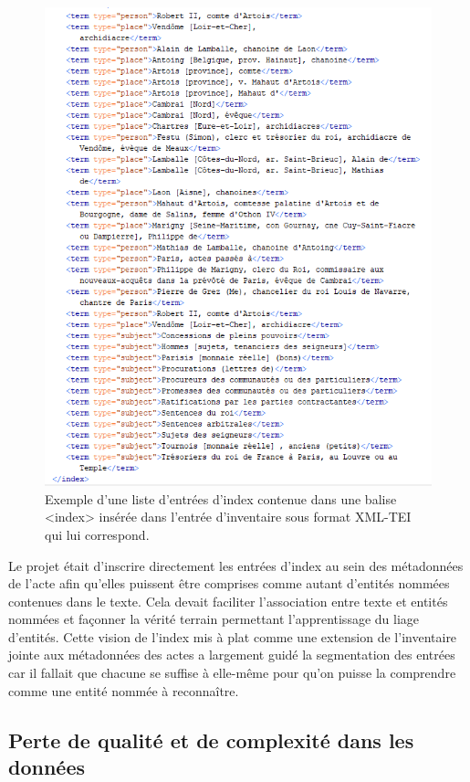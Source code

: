 \documentclass[a4paper,12pt,twoside]{book}
\begin{document}
	\begin{figure}
		\centering
		\includegraphics[width=\textwidth]{Images/Index_in_inventaire.png}
		\caption{Exemple d'une liste d'entrées d'index contenue dans une balise <index> insérée dans l'entrée d'inventaire sous format XML-TEI qui lui correspond.}
		\label{index_in_inventaire}
	\end{figure} 
	
	Le projet était d'inscrire directement les entrées d'index au sein des métadonnées de l'acte afin qu'elles puissent être comprises comme autant d'entités nommées contenues dans le texte. Cela devait faciliter l'association entre texte et entités nommées et façonner la vérité terrain permettant l'apprentissage du liage d'entités. Cette vision de l'index mis à plat comme une extension de l'inventaire jointe aux métadonnées des actes a largement guidé la segmentation des entrées car il fallait que chacune se suffise à elle-même pour qu'on puisse la comprendre comme une entité nommée à reconnaître.
	
	\subsection{Perte de qualité et de complexité dans les données}
	
\end{document}
